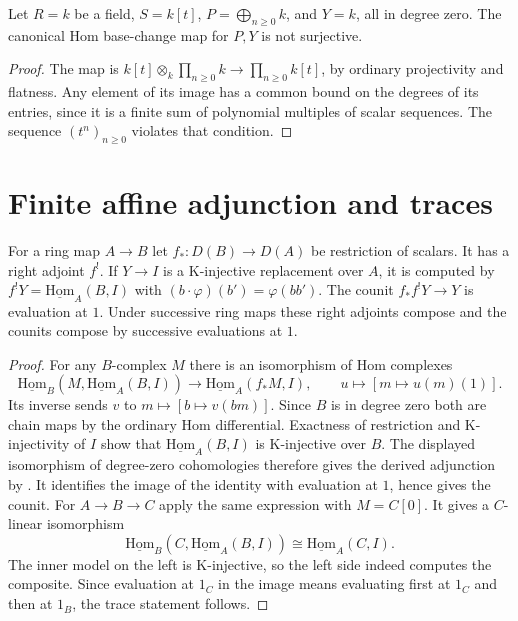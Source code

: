 \begin{example}\label{res:U13}
Let \(R=k\) be a field, \(S=k[t]\), \(P=\bigoplus_{n\geq0}k\),
and \(Y=k\), all in degree zero. The canonical Hom base-change
map for \(P,Y\) is not surjective.
\end{example}
\begin{proof}
The map is \(k[t]\otimes_k\prod_{n\geq0}k\to\prod_{n\geq0}k[t]\),
by ordinary projectivity and flatness. Any element of its image
has a common bound on the degrees of its entries, since it is a
finite sum of polynomial multiples of scalar sequences.
The sequence \((t^n)_{n\geq0}\) violates that condition.
\end{proof}

\section{Finite affine adjunction and traces}

\begin{theorem}\label{res:U14}
For a ring map \(A\to B\) let \(f_*:D(B)\to D(A)\) be
restriction of scalars. It has a right adjoint \(f^!\).
If \(Y\to I\) is a K-injective replacement over \(A\), it is computed
by \(f^!Y=\underline{\mathrm{Hom}}_A(B,I)\) with
\((b\cdot\varphi)(b')=\varphi(bb')\).
The counit \(f_*f^!Y\to Y\) is evaluation at \(1\).
Under successive ring maps these right adjoints compose and
the counits compose by successive evaluations at \(1\).
\end{theorem}
\begin{proof}
For any \(B\)-complex \(M\) there is an isomorphism of Hom complexes
\[
 \underline{\mathrm{Hom}}_B
  (M,\underline{\mathrm{Hom}}_A(B,I))
 \longrightarrow \underline{\mathrm{Hom}}_A(f_*M,I),
 \qquad u\longmapsto [m\mapsto u(m)(1)].
\]
Its inverse sends \(v\) to \(m\mapsto[b\mapsto v(bm)]\).
Since \(B\) is in degree zero both are chain maps by the ordinary
Hom differential. Exactness of restriction and K-injectivity
of \(I\) show that \(\underline{\mathrm{Hom}}_A(B,I)\)
is K-injective over \(B\). The displayed isomorphism of degree-zero
cohomologies therefore gives the derived adjunction by
\cite[R04]{ha-core}. It identifies the image of the identity
with evaluation at \(1\), hence gives the counit.
For \(A\to B\to C\) apply the same expression with \(M=C[0]\).
It gives a \(C\)-linear isomorphism
\[
 \underline{\mathrm{Hom}}_B(C,\underline{\mathrm{Hom}}_A(B,I))
 \cong\underline{\mathrm{Hom}}_A(C,I).
\]
The inner model on the left is K-injective, so the left side indeed
computes the composite. Since evaluation at \(1_C\) in the
image means evaluating first at \(1_C\) and then at \(1_B\),
the trace statement follows.
\end{proof}

